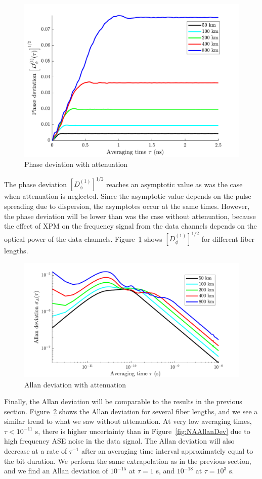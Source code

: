 %
\begin{figure}[htb]
	\centering
	\includegraphics[scale=0.9]{img/APhaseStability}
	\caption{Phase deviation with attenuation} \label{fig:APhaseStability}
\end{figure}
% 
The phase deviation $\left[D^{(1)}_\phi\right]^{1/2}$ reaches an asymptotic value as was the case when attenuation is neglected. Since the asymptotic value depends on the pulse spreading due to dispersion, the asymptotes occur at the same times. However, the phase deviation will be lower than was the case without attenuation, because the effect of XPM on the frequency signal from the data channels depends on the optical power of the data channels. Figure~\ref{fig:APhaseStability} shows $\left[D^{(1)}_\phi\right]^{1/2}$ for different fiber lengths.

%
\begin{figure}[htb]
	\centering
	\includegraphics[scale=0.9]{img/AAllanDev}
	\caption{Allan deviation with attenuation} \label{fig:AAllanDev}
\end{figure}
% 
Finally, the Allan deviation will be comparable to the results in the previous section. Figure~\ref{fig:AAllanDev} shows the Allan deviation for several fiber lengths, and we see a similar trend to what we saw without attenuation. At very low averaging times, $\tau < 10^{-11}$ s, there is higher uncertainty than in Figure~\ref{fig:NAAllanDev} due to high frequency ASE noise in the data signal. The Allan deviation will also decrease at a rate of $\tau^{-1}$ after an averaging time interval approximately equal to the bit duration. We perform the same extrapolation as in the previous section, and we find an Allan deviation of $10^{-15}$ at $\tau=1$ s, and $10^{-18}$ at $\tau=10^3$ s.

